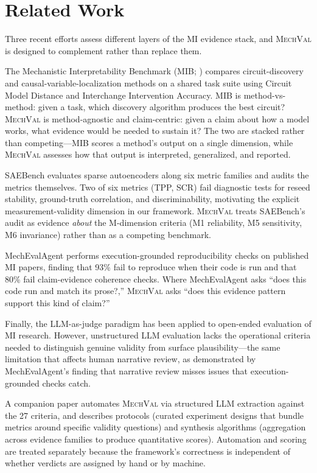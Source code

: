 \documentclass[10pt]{article}
\newcommand{\mechval}{\textsc{MechVal}}
\begin{document}
\section{Related Work}
\label{sec:related}

Three recent efforts assess different layers of the MI evidence stack, and \mechval{} is designed to complement rather than replace them.

The Mechanistic Interpretability Benchmark (MIB; \citealp{mueller2025mib}) compares circuit-discovery and causal-variable-localization methods on a shared task suite using Circuit Model Distance and Interchange Intervention Accuracy. MIB is method-vs-method: given a task, which discovery algorithm produces the best circuit? \mechval{} is method-agnostic and claim-centric: given a claim about how a model works, what evidence would be needed to sustain it? The two are stacked rather than competing---MIB scores a method's output on a single dimension, while \mechval{} assesses how that output is interpreted, generalized, and reported.

SAEBench \citep{karvonen2025saebench} evaluates sparse autoencoders along six metric families and audits the metrics themselves. Two of six metrics (TPP, SCR) fail diagnostic tests for reseed stability, ground-truth correlation, and discriminability, motivating the explicit measurement-validity dimension in our framework. \mechval{} treats SAEBench's audit as evidence \emph{about} the M-dimension criteria (M1 reliability, M5 sensitivity, M6 invariance) rather than as a competing benchmark.

MechEvalAgent \citep{bai2026mecheval} performs execution-grounded reproducibility checks on published MI papers, finding that 93\% fail to reproduce when their code is run and that 80\% fail claim-evidence coherence checks. Where MechEvalAgent asks ``does this code run and match its prose?,'' \mechval{} asks ``does this evidence pattern support this kind of claim?''

Finally, the LLM-as-judge paradigm \citep{zheng2023judging} has been applied to open-ended evaluation of MI research. However, unstructured LLM evaluation lacks the operational criteria needed to distinguish genuine validity from surface plausibility---the same limitation that affects human narrative review, as demonstrated by MechEvalAgent's finding that narrative review misses issues that execution-grounded checks catch.

A companion paper automates \mechval{} via structured LLM extraction against the 27 criteria, and describes protocols (curated experiment designs that bundle metrics around specific validity questions) and synthesis algorithms (aggregation across evidence families to produce quantitative scores). Automation and scoring are treated separately because the framework's correctness is independent of whether verdicts are assigned by hand or by machine.
\end{document}
